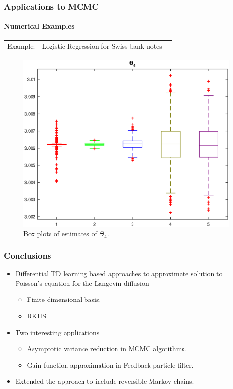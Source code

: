 \documentclass[xcolor=dvipsnames, subsection=false]{beamer}
\def\alertb#1{\alert{\color{BrickRed}  #1}}
\def\alertb#1{\alert{\color{BrickRed}  #1}}
\begin{document}
\begin{frame}
\frametitle{Applications to MCMC}
\framesubtitle{Numerical Examples}
\begin{tabular}{lll}\alertb{Example:}   & Logistic Regression for Swiss bank notes
	\\
\end{tabular}
\begin{figure}[H]
	\begin{center}
	\includegraphics[width=0.6\hsize]{hist_Theta_4_no_std.eps}
	\tiny
	\caption{ Box plots of estimates of $\Theta_4$.}
	\end{center}
\end{figure}
\end{frame}

\begin{frame}
\frametitle{Conclusions}
\begin{itemize}
	\item Differential TD learning based approaches to approximate solution to Poisson's equation for the Langevin diffusion.\\[-0.1cm]
	 \begin{itemize}
	 	\item Finite dimensional basis.
	 	\item RKHS.
	 \end{itemize}
	\item Two interesting applications
	\begin{itemize}
		\item Asymptotic variance reduction in MCMC algorithms.
		\item Gain function approximation in Feedback particle filter.
	\end{itemize}
	\item Extended the approach to include reversible Markov chains.
\end{itemize}
\end{frame}
\end{document}
